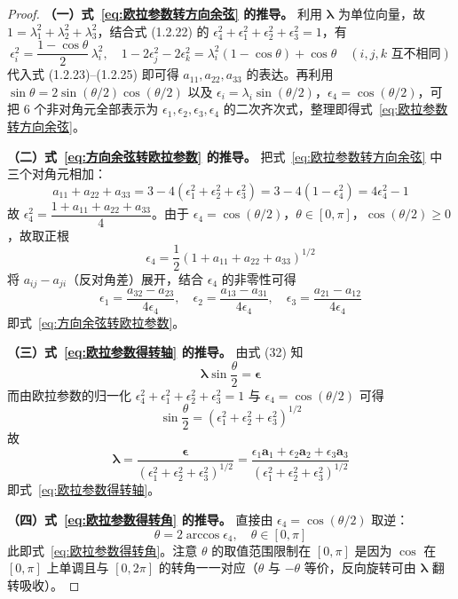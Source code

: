 \begin{proof}
\textbf{（一）式~\eqref{eq:欧拉参数转方向余弦} 的推导。}  利用 $\boldsymbol{\lambda}$ 为单位向量，故 $1=\lambda_1^2+\lambda_2^2+\lambda_3^2$，结合式 (1.2.22) 的 $\epsilon_4^2+\epsilon_1^2+\epsilon_2^2+\epsilon_3^2=1$，有
$$
\epsilon_i^2=\frac{1-\cos\theta}{2}\,\lambda_i^{2},\quad 1-2\epsilon_j^2-2\epsilon_k^2=\lambda_i^2(1-\cos\theta)+\cos\theta \quad (i,j,k\text{ 互不相同})
$$
代入式 (1.2.23)--(1.2.25) 即可得 $a_{11},a_{22},a_{33}$ 的表达。再利用 $\sin\theta=2\sin(\theta/2)\cos(\theta/2)$ 以及 $\epsilon_i=\lambda_i\sin(\theta/2)$，$\epsilon_4=\cos(\theta/2)$，可把 6 个非对角元全部表示为 $\epsilon_1,\epsilon_2,\epsilon_3,\epsilon_4$ 的二次齐次式，整理即得式~\eqref{eq:欧拉参数转方向余弦}。

\textbf{（二）式~\eqref{eq:方向余弦转欧拉参数} 的推导。}  把式~\eqref{eq:欧拉参数转方向余弦} 中三个对角元相加：
$$
a_{11}+a_{22}+a_{33}=3-4(\epsilon_1^2+\epsilon_2^2+\epsilon_3^2)=3-4(1-\epsilon_4^2)=4\epsilon_4^2-1
$$
故 $\epsilon_4^2=\dfrac{1+a_{11}+a_{22}+a_{33}}{4}$。由于 $\epsilon_4=\cos(\theta/2)$，$\theta\in[0,\pi]$，$\cos(\theta/2)\geq 0$，故取正根
$$
\epsilon_4=\frac{1}{2}(1+a_{11}+a_{22}+a_{33})^{1/2}
$$
将 $a_{ij}-a_{ji}$（反对角差）展开，结合 $\epsilon_4$ 的非零性可得
$$
\epsilon_1=\frac{a_{32}-a_{23}}{4\epsilon_4},\quad \epsilon_2=\frac{a_{13}-a_{31}}{4\epsilon_4},\quad \epsilon_3=\frac{a_{21}-a_{12}}{4\epsilon_4}
$$
即式~\eqref{eq:方向余弦转欧拉参数}。

\textbf{（三）式~\eqref{eq:欧拉参数得转轴} 的推导。}  由式 (32) 知
$$
\boldsymbol{\lambda}\sin\frac{\theta}{2}=\boldsymbol{\epsilon}
$$
而由欧拉参数的归一化 $\epsilon_4^2+\epsilon_1^2+\epsilon_2^2+\epsilon_3^2=1$ 与 $\epsilon_4=\cos(\theta/2)$ 可得
$$
\sin\frac{\theta}{2}=(\epsilon_1^2+\epsilon_2^2+\epsilon_3^2)^{1/2}
$$
故
$$
\boldsymbol{\lambda}=\frac{\boldsymbol{\epsilon}}{(\epsilon_1^2+\epsilon_2^2+\epsilon_3^2)^{1/2}}=\frac{\epsilon_1\mathbf{a}_1+\epsilon_2\mathbf{a}_2+\epsilon_3\mathbf{a}_3}{(\epsilon_1^2+\epsilon_2^2+\epsilon_3^2)^{1/2}}
$$
即式~\eqref{eq:欧拉参数得转轴}。

\textbf{（四）式~\eqref{eq:欧拉参数得转角} 的推导。}  直接由 $\epsilon_4=\cos(\theta/2)$ 取逆：
$$
\theta=2\arccos\epsilon_4,\quad \theta\in[0,\pi]
$$
此即式~\eqref{eq:欧拉参数得转角}。注意 $\theta$ 的取值范围限制在 $[0,\pi]$ 是因为 $\cos$ 在 $[0,\pi]$ 上单调且与 $[0,2\pi]$ 的转角一一对应（$\theta$ 与 $-\theta$ 等价，反向旋转可由 $\boldsymbol{\lambda}$ 翻转吸收）。


\end{proof}

